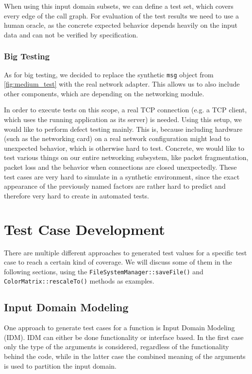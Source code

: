 \documentclass{scrreprt}
\begin{document}
When using this input domain subsets, we can define a test set, which covers every edge of the call graph. For evaluation of the test results we need to use a human oracle, as the concrete expected behavior depends heavily on the input data and can not be verified by specification.

\subsubsection{Big Testing}

As for big testing, we decided to replace the synthetic \texttt{msg} object from \vref{fig:medium_test} with the real network adapter. This allows us to also include other components, which are depending on the networking module.

In order to execute tests on this scope, a real TCP connection (e.g. a TCP client, which uses the running application as its server) is needed. Using this setup, we would like to perform defect testing mainly. This is, because including hardware (such as the networking card) on a real network configuration might lead to unexpected behavior, which is otherwise hard to test. Concrete, we would like to test various things on our entire networking subsystem, like packet fragmentation, packet loss and the behavior when connections are closed unexpectedly. These test cases are very hard to simulate in a synthetic environment, since the exact appearance of the previously named factors are rather hard to predict and therefore very hard to create in automated tests.

\section{Test Case Development}

There are multiple different approaches to generated test values for a specific test case to reach a certain kind of coverage. We will discuss some of them in the following sections, using the \texttt{FileSystemManager::saveFile()} and  \texttt{ColorMatrix::rescaleTo()} methods as examples.

\subsection{Input Domain Modeling}

One approach to generate test cases for a function is Input Domain Modeling (IDM). IDM can either be done functionality or interface based. In the first case only the type of the arguments is considered, regardless of the functionality behind the code, while in the latter case the combined meaning of the arguments is used to partition the input domain.
\end{document}
